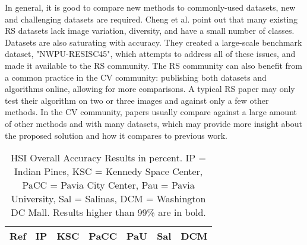 \documentclass[12pt]{spieman}
\begin{document}
\begin{spacing}{1}
In general, it is good to compare new methods to commonly-used datasets, new and challenging datasets are required. Cheng et al. \cite{Cheng, Cheng2016} point out that many existing RS datasets lack image variation, diversity, and have a small number of classes. Datasets are also saturating with accuracy. They created a large-scale benchmark dataset, "NWPU-RESISC45", which attempts to address all of these issues, and made it available to the RS community. The RS community can also benefit from a common practice in the CV community: publishing both datasets and algorithms online, allowing for more comparisons. A typical RS paper may only test their algorithm on two or three images and against only a few other methods. In the CV community, papers usually compare against a large amount of other methods and with many datasets, which may provide more insight about the proposed solution and how it compares to previous work.

\begin{table}[ht]
\centering

\caption{HSI Overall Accuracy Results in percent. IP = Indian Pines, KSC = Kennedy Space Center, PaCC = Pavia City Center, Pau = Pavia University, Sal = Salinas, DCM = Washington DC Mall. Results higher than 99\% are in bold.}
\label{table:HSI_OA_Results}
\begin{tabular}{|c|c|c|c|c|c|c|}
\hline

Ref     & IP & KSC & PaCC & PaU & Sal & DCM \\ \hline


\end{tabular}
\end{table}
\end{spacing}
\end{document}
